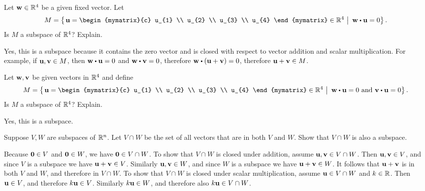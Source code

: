 \begin{enumialphparenastyle}
\begin{ex}
  Let $\mbox{\bf w}\in \mathbb{R}^{4}$ be a given fixed vector. Let
  \begin{equation*}
    M=\set{\left.\vect{u}
        =\begin{mymatrix}{c}
          u_{1} \\ u_{2} \\ u_{3} \\ u_{4}
        \end{mymatrix} \in \R^{4}~\right\vert~ \vect{w}\dotprod \vect{u}
      =0}.
  \end{equation*}
  Is $M$ a subspace of $\mathbb{R}^4$? Explain.
  \begin{sol}
    Yes, this is a subspace because it contains the zero vector and is
    closed with respect to vector addition and scalar
    multiplication. For example, if $\mbox{\bf u},\mbox{\bf v}\in M$, then
    $\vect{w}\dotprod\vect{u}=0$ and $\vect{w}\dotprod\vect{v}=0$,
    therefore $\vect{w}\dotprod(\vect{u}+\vect{v})=0$, therefore
    $\mbox{\bf u}+\mbox{\bf v}\in M$.
  \end{sol}
\end{ex}

\begin{ex}
  Let $\mbox{\bf w},\mbox{\bf v}$ be given vectors in $\mathbb{R}^{4}$ and define 
  \begin{equation*}
    M=\set{\left.\vect{u}=\begin{mymatrix}{c}
        u_{1} \\ u_{2} \\ u_{3} \\ u_{4}
      \end{mymatrix} \in \R
      ^{4}~\right\vert~ \vect{w}\dotprod \vect{u}=0\text{ and }\vect{v}\dotprod \vect{u}=0}
    .
  \end{equation*}
  Is $M$ a subspace of $\mathbb{R}^4$? Explain.
  \begin{sol}
    Yes, this is a subspace.
  \end{sol}
\end{ex}

\begin{ex}
  Suppose $V, W$ are subspaces of $\mathbb{R}^{n}$. Let $V\cap W$ be the set
  of all vectors that are in both $V$ and $W$. Show that $V\cap W$
  is also a subspace.
  \begin{sol}
    Because $\mbox{\bf 0}\in V$ and $\mbox{\bf 0}\in W$, we have
    $\mbox{\bf 0}\in V\cap W$. To show that $V\cap W$ is closed under
    addition, assume $\mbox{\bf u},\mbox{\bf v}\in V\cap W$. Then
    $\mbox{\bf u},\mbox{\bf v}\in V$, and since $V$ is a subspace we have
    $\mbox{\bf u}+\mbox{\bf v}\in V$. Similarly $\mbox{\bf u},\mbox{\bf v}\in W$, and
    since $W$ is a subspace we have $\mbox{\bf u}+\mbox{\bf v}\in W$. It
    follows that $\mbox{\bf u}+\mbox{\bf v}$ is in both $V$ and $W$, and
    therefore in $V\cap W$. To show that $V\cap W$ is closed under
    scalar multiplication, assume $\mbox{\bf u}\in V\cap W$ and
    $k\in\mathbb{R}$. Then $\mbox{\bf u}\in V$, and therefore $k\mbox{\bf u}\in
    V$. Similarly $k\mbox{\bf u}\in W$, and therefore also
    $k\mbox{\bf u}\in V\cap W$.
  \end{sol}
\end{ex}


\end{enumialphparenastyle}
